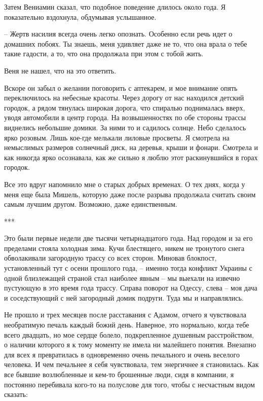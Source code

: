 \documentclass[
]{book}
\begin{document}
Затем Вениамин сказал, что подобное поведение длилось около года. Я показательно вздохнула, обдумывая услышанное.

-- Жертв насилия всегда очень легко опознать. Особенно если речь идет о домашних побоях. Ты знаешь, меня удивляет даже не то, что она врала о тебе такие гадости, а то, что она продолжала при этом с тобой жить.

Веня не нашел, что на это ответить.

Вскоре он забыл о желании поговорить с аптекарем, и мое внимание опять переключилось на небесные красоты. Через дорогу от нас находился детский городок, а рядом тянулась широкая дорога, что спиралью поднималась вверх, уводя автомобили в центр города. На возвышенностях по обе стороны трассы виднелись небольшие домики. За ними то и садилось солнце. Небо сделалось ярко розовым. Лишь кое-где мелькали лиловые просветы. Я смотрела на немыслимых размеров солнечный диск, на деревья, крыши и фонари. Смотрела и как никогда ярко осознавала, как же сильно я люблю этот раскинувшийся в горах городок.

Все это вдруг напомнило мне о старых добрых временах. О тех днях, когда у меня еще была Мишель, которую даже после разрыва продолжала считать своим самым лучшим другом. Возможно, даже единственным.

***

Это были первые недели две тысячи четырнадцатого года. Над городом и за его пределами стояла холодная зима. Кучи блестящего, никем не тронутого снега обволакивали загородную трассу со всех сторон. Миновав блокпост, установленный тут с осени прошлого года, -- именно тогда конфликт Украины с одной близлежащей страной стал наиболее явным -- мы выехали на извечно пустующую в это время года трассу. Справа поворот на Одессу, слева -- моя дача и соседствующий с ней загородный домик подруги. Туда мы и направлялись.

Не прошло и трех месяцев после расставания с Адамом, отчего я чувствовала необратимую печаль каждый божий день. Наверное, это нормально, когда тебе всего двадцать, но мое сердце болело, подкрепленное душевным расстройством, о наличии которого я к тому моменту не имела ни малейшего понятия. Внезапно для всех я превратилась в одновременно очень печального и очень веселого человека. И чем печальнее я себя чувствовала, тем энергичнее я становилась. Как все бывшие возлюбленные и кем-то брошенные люди, сидя в компании, я постоянно перебивала кого-то на полуслове для того, чтобы с несчастным видом сказать:
\end{document}
